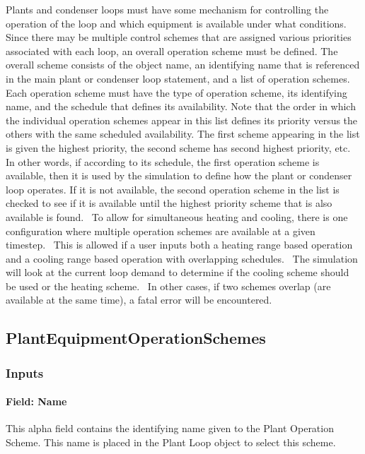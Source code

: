 Plants and condenser loops must have some mechanism for controlling the operation of the loop and which equipment is available under what conditions. Since there may be multiple control schemes that are assigned various priorities associated with each loop, an overall operation scheme must be defined. The overall scheme consists of the object name, an identifying name that is referenced in the main plant or condenser loop statement, and a list of operation schemes. Each operation scheme must have the type of operation scheme, its identifying name, and the schedule that defines its availability. Note that the order in which the individual operation schemes appear in this list defines its priority versus the others with the same scheduled availability. The first scheme appearing in the list is given the highest priority, the second scheme has second highest priority, etc. In other words, if according to its schedule, the first operation scheme is available, then it is used by the simulation to define how the plant or condenser loop operates. If it is not available, the second operation scheme in the list is checked to see if it is available until the highest priority scheme that is also available is found.~ To allow for simultaneous heating and cooling, there is one configuration where multiple operation schemes are available at a given timestep.~ This is allowed if a user inputs both a heating range based operation and a cooling range based operation with overlapping schedules.~ The simulation will look at the current loop demand to determine if the cooling scheme should be used or the heating scheme.~ In other cases, if two schemes overlap (are available at the same time), a fatal error will be encountered.

\subsection{PlantEquipmentOperationSchemes}\label{plantequipmentoperationschemes}

\subsubsection{Inputs}\label{inputs-033}

\paragraph{Field: Name}\label{field-name-032}

This alpha field contains the identifying name given to the Plant Operation Scheme. This name is placed in the Plant Loop object to select this scheme.

